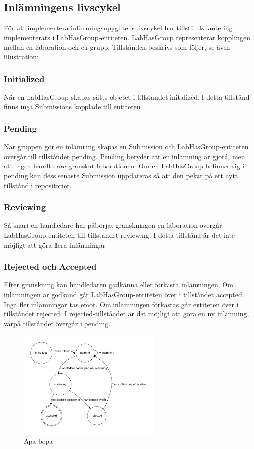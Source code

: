 \subsection{Inlämningens livscykel}

För att implementera inlämningsuppgiftens livscykel har tillståndshantering implementerats i LabHasGroup-entiteten. LabHasGroup representerar kopplingen mellan en laboration och en grupp.
Tillstånden beskrivs som följer, se även illustration:

\subsubsection{Initialized}

När en LabHasGroup skapas sätts objetet i tillståndet initalized. I detta tillstånd finns inga Submissions kopplade till entiteten.

\subsubsection{Pending}

När gruppen gör en inlämning skapas en Submission och LabHasGroup-entiteten övergår till tillståndet pending. Pending betyder att en inlämning är gjord, men att ingen handledare granskat laborationen.
Om en LabHasGroup befinner sig i pending kan dess senaste Submission uppdateras så att den pekar på ett nytt tillstånd i repositoriet.

\subsubsection{Reviewing}

Så snart en handledare har påbörjat granskningen en laboration övergår LabHasGroup-entiteten till tillståndet reviewing. I detta tillstånd är det inte möjligt att göra flera inlämningar

\subsubsection{Rejected och Accepted}

Efter granskning kan handledaren godkänna eller förkasta inlämningen. Om inlämningen är godkänd går LabHasGroup-entiteten över i tillståndet accepted. Inga fler inlämningar tas emot. Om inlämningen förkastas går entiteten över i tillståndet rejected. I rejected-tillståndet är det möjligt att göra en ny inlämning, varpå tillståndet övergår i pending.

\begin{figure}\label{fig:livscykel}
  \includegraphics[width=7.0cm]{fig/labgroup/state-machine.pdf}             
  \caption[Inlämningsuppgiftens livscykel]
  {Apa bepa}
\end{figure}